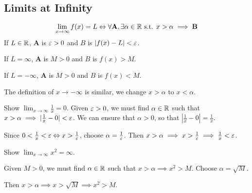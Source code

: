 \documentclass{article}
\begin{document}
\subsection{Limits at Infinity}
\begin{definition}

\[
\lim_{x\to \infty} f(x) = L \Leftrightarrow \forall \textbf{A}, \exists \alpha \in \mathbb{R} \text{ s.t. } x > \alpha \implies \textbf{B}
\]
If $L \in \mathbb{R}$, \textbf{A} is $\varepsilon > 0$ and $B$ is $|f(x) - L| < \varepsilon$.

If $L = \infty$, \textbf{A} is $M > 0$ and $B$ is $f(x) > M$.

If $L = -\infty$, \textbf{A} is $M > 0$ and $B$ is $f(x) < M$.

The definition of $x \to -\infty$ is similar, we change $x > \alpha$ to $x < \alpha$.
\end{definition}
\begin{example}
Show $\lim_{x\to\infty} \frac{1}{x} = 0$.
Given $\varepsilon > 0$, we must find $\alpha \in \mathbb{R}$ such that $x > \alpha \implies |\frac{1}{x} - 0| < \varepsilon$. We can ensure that $\alpha > 0$, so that $|\frac{1}{x} - 0| = \frac{1}{x}$.

Since $0 < \frac{1}{x} < \varepsilon \Leftrightarrow x > \frac{1}{\varepsilon}$, choose $\alpha = \frac{1}{\varepsilon}$.
Then $x > \alpha \implies x > \frac{1}{\varepsilon} \implies \frac{1}{x} < \varepsilon$.
\end{example}
\begin{example}
Show $\lim_{x\to\infty} x^2 = \infty$.

Given $M > 0$, we must find $\alpha \in \mathbb{R}$ such that $x > \alpha \implies x^2 > M$. Choose $\alpha  = \sqrt{M}$.

Then $x > \alpha \implies x > \sqrt{M} \implies x^2 > M$.
\end{example}
\end{document}
